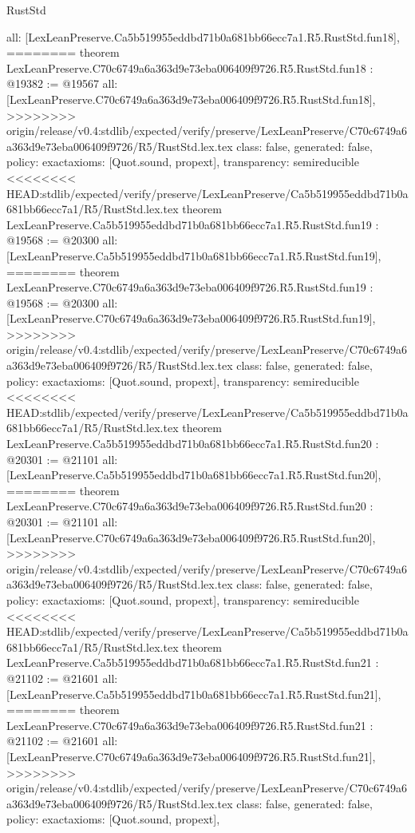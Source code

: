 \begin{lexlean}{RustStd}
\begin{coremodule}
{\begin{coremodule}
{{{{{{{{{{{{{{{{{{{{{  all: [LexLeanPreserve.Ca5b519955eddbd71b0a681bb66ecc7a1.R5.RustStd.fun18],
========
theorem LexLeanPreserve.C70c6749a6a363d9e73eba006409f9726.R5.RustStd.fun18 : @19382 := @19567 {
  all: [LexLeanPreserve.C70c6749a6a363d9e73eba006409f9726.R5.RustStd.fun18],
>>>>>>>> origin/release/v0.4:stdlib/expected/verify/preserve/LexLeanPreserve/C70c6749a6a363d9e73eba006409f9726/R5/RustStd.lex.tex
  class: false,
  generated: false,
  policy: exact{axioms: [Quot.sound, propext]},
  transparency: semireducible
}
<<<<<<<< HEAD:stdlib/expected/verify/preserve/LexLeanPreserve/Ca5b519955eddbd71b0a681bb66ecc7a1/R5/RustStd.lex.tex
theorem LexLeanPreserve.Ca5b519955eddbd71b0a681bb66ecc7a1.R5.RustStd.fun19 : @19568 := @20300 {
  all: [LexLeanPreserve.Ca5b519955eddbd71b0a681bb66ecc7a1.R5.RustStd.fun19],
========
theorem LexLeanPreserve.C70c6749a6a363d9e73eba006409f9726.R5.RustStd.fun19 : @19568 := @20300 {
  all: [LexLeanPreserve.C70c6749a6a363d9e73eba006409f9726.R5.RustStd.fun19],
>>>>>>>> origin/release/v0.4:stdlib/expected/verify/preserve/LexLeanPreserve/C70c6749a6a363d9e73eba006409f9726/R5/RustStd.lex.tex
  class: false,
  generated: false,
  policy: exact{axioms: [Quot.sound, propext]},
  transparency: semireducible
}
<<<<<<<< HEAD:stdlib/expected/verify/preserve/LexLeanPreserve/Ca5b519955eddbd71b0a681bb66ecc7a1/R5/RustStd.lex.tex
theorem LexLeanPreserve.Ca5b519955eddbd71b0a681bb66ecc7a1.R5.RustStd.fun20 : @20301 := @21101 {
  all: [LexLeanPreserve.Ca5b519955eddbd71b0a681bb66ecc7a1.R5.RustStd.fun20],
========
theorem LexLeanPreserve.C70c6749a6a363d9e73eba006409f9726.R5.RustStd.fun20 : @20301 := @21101 {
  all: [LexLeanPreserve.C70c6749a6a363d9e73eba006409f9726.R5.RustStd.fun20],
>>>>>>>> origin/release/v0.4:stdlib/expected/verify/preserve/LexLeanPreserve/C70c6749a6a363d9e73eba006409f9726/R5/RustStd.lex.tex
  class: false,
  generated: false,
  policy: exact{axioms: [Quot.sound, propext]},
  transparency: semireducible
}
<<<<<<<< HEAD:stdlib/expected/verify/preserve/LexLeanPreserve/Ca5b519955eddbd71b0a681bb66ecc7a1/R5/RustStd.lex.tex
theorem LexLeanPreserve.Ca5b519955eddbd71b0a681bb66ecc7a1.R5.RustStd.fun21 : @21102 := @21601 {
  all: [LexLeanPreserve.Ca5b519955eddbd71b0a681bb66ecc7a1.R5.RustStd.fun21],
========
theorem LexLeanPreserve.C70c6749a6a363d9e73eba006409f9726.R5.RustStd.fun21 : @21102 := @21601 {
  all: [LexLeanPreserve.C70c6749a6a363d9e73eba006409f9726.R5.RustStd.fun21],
>>>>>>>> origin/release/v0.4:stdlib/expected/verify/preserve/LexLeanPreserve/C70c6749a6a363d9e73eba006409f9726/R5/RustStd.lex.tex
  class: false,
  generated: false,
  policy: exact{axioms: [Quot.sound, propext]},
}}}}}}}}}}}}}}}}}}}}}}}}}
\end{coremodule}}
\end{coremodule}
\end{lexlean}
